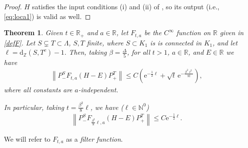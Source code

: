 \documentclass[12pt, a4paper,reqno]{amsart}
\numberwithin{equation}{section}
\newtheorem{theorem}{Theorem}[section]
\newcommand\R{\mathbb R}
\newcommand\N{\mathbb N}
\newcommand\Z{\mathbb Z}
\newcommand\e{\mathrm{e}}
\renewcommand{\d}{\mathrm{d}}
\newcommand\be{\begin{equation}\begin{aligned}}
\newcommand\ee{\end{aligned}\end{equation}}
\newcommand{\norm}[1]{\left\lVert #1 \right\rVert}
\newcommand{\pa}[1]{\left( #1 \right)}
\newcommand\La{\Lambda}
\begin{document}
 \begin{proof}
  $H$ satisfies the input conditions (i) and (ii)  of  \cite[Lemma B.1]{EK22}, so its output (i.e., \eqref{eq:loca1}) is valid as well. 
 \end{proof}
\begin{theorem}\label{thmlocal} Given $t\in \R_+$ and $a\in\R$, 
let $F_{t,a}$ be the $C^\infty$  function on $\R$ given  in \eqref{defF}. 
Let   $S\subsetneq  T\subset \La$, $S,T$  finite, where $S\subset K_1$ is is connected in $K_1$,  and  let
$\ell= \d_\Z\pa{S,T^c}-1$. Then, taking   $ \beta= \frac \Delta {5} $,  for all  $t>1$,  $a\in \R$,  and  $E\in \R$ we have
 \be\label{locest}
\norm{P_-^{{S}}  F_{t,a}(H-E) P_+^{{T}}}\le  C    \pa{  \e^{-\frac 12\ell} +   \sqrt{t} \,\e^{-\frac { \beta^2\ell^2}{8t}} },
\ee 
where all constants are $a$-independent. 

In particular,  taking  $t=\frac {\beta^2}8 \ell$,    we have   ($\ell \in \N^0$)
\be\label{locest2}
\norm{P_-^{{S}}  F_{\frac {\beta^2}8 \ell,a}(H-E) P_+^{{T}}}  \le C\e^{- \frac 12 \ell} .
\ee 
\end{theorem}
We will refer to $F_{t,a}$ as a {\it filter function}.
\end{document}
